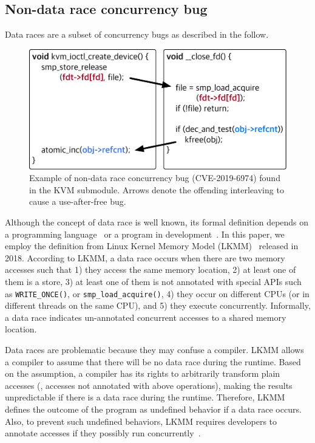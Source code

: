 \subsection{Non-data race concurrency bug}
\label{s:appendix:datarace}

Data races are a subset of concurrency bugs as described in the
follow.


\begin{figure}
  \centering
  \includegraphics[width=0.85\linewidth]{fig/racecondition.pdf}
  \caption{Example of non-data race concurrency bug (CVE-2019-6974)
    found in the KVM submodule. Arrows denote the offending
    interleaving to cause a use-after-free bug.}
  \label{fig:concurrencybugs}
\end{figure}


%
Although the concept of data race is well known, its formal definition
depends on a programming language~\cite{C-standard-n2310,
  java-standard} or a program in development~\cite{lkmm}. In this
paper, we employ the definition from Linux Kernel Memory Model
(LKMM)~\cite{lkmm} released in 2018. According to LKMM, a data race
occurs when there are two memory accesses such that 1) they access the
same memory location, 2) at least one of them is a store, 3) at least
one of them is not annotated with special APIs such as
\texttt{WRITE_ONCE()}, or \texttt{smp_load_acquire()}, 4) they occur
on different CPUs (or in different threads on the same CPU), and 5)
they execute concurrently.
%
Informally, a data race indicates un-annotated concurrent accesses to
a shared memory location.

Data races are problematic because they may confuse a compiler.  LKMM
allows a compiler to assume that there will be no data race during the
runtime. Based on the assumption, a compiler has its rights to
arbitrarily transform plain accesses (\ie, accesses not annotated with
above operations), making the results unpredictable if there is a data
race during the runtime.
%
Therefore, LKMM defines the outcome of the program as undefined
behavior if a data race occurs.
%
Also, to prevent such undefined behaviors, LKMM requires developers to
annotate accesses if they possibly run
concurrently~\cite{data-race-fix1, data-race-fix2, data-race-fix3}.


